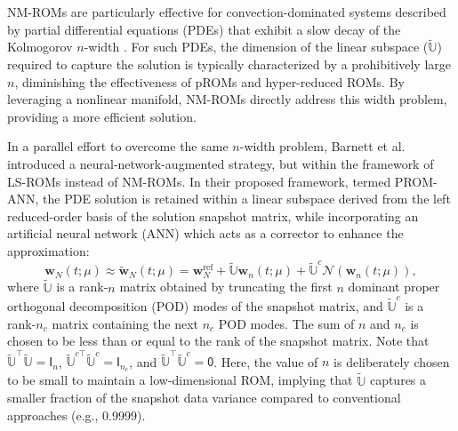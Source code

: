 \documentclass[11pt]{article}
\renewcommand{\vec}[1]{\mathbf{#1}}
\newcommand{\mat}[1]{\mathsf{#1}}
\begin{document}
NM-ROMs are particularly effective for convection-dominated systems described by partial differential equations (PDEs) that exhibit a slow decay of the Kolmogorov $n$-width \cite{lee2020model}.
For such PDEs, the dimension of the linear subspace (\(\widetilde{\mathbb{U}}\)) required to capture the solution is typically characterized by a prohibitively large $n$, diminishing the effectiveness of pROMs and hyper-reduced ROMs.
By leveraging a nonlinear manifold, NM-ROMs directly address this width problem, providing a more efficient solution.


In a parallel effort to overcome the same $n$-width problem, Barnett et al.
\cite{barnett2023neural-network-augmenteda} introduced a neural-network-augmented strategy, but within the framework of LS-ROMs instead of NM-ROMs.
In their proposed framework, termed PROM-ANN, the PDE solution is retained within a linear subspace derived from the left reduced-order basis of the solution snapshot matrix, while incorporating an artificial neural network (ANN) which acts as a corrector to enhance the approximation:
\begin{equation}
  \vec{w}_N(t; \mu) \approx \widetilde{\mathbf{w}}_N(t; \mu) = \mathbf{w}_N^{\text{ref}} +  \widetilde{\mathbb{U}} \vec{w}_n(t; \mu) + \widetilde{\mathbb{U}}^{c} \mathscr{N}(\vec{w}_n(t; \mu)),
  \label{eq:pROM_idea}
\end{equation}
where \(\widetilde{\mathbb{U}}\) is a rank-\(n\) matrix obtained by truncating the first \(n\) dominant proper orthogonal decomposition (POD) modes of the snapshot matrix, and \(\widetilde{\mathbb{U}}^c\) is a rank-\(n_c\) matrix containing the next \(n_c\) POD modes.
The sum of \(n\) and \(n_c\) is chosen to be less than or equal to the rank of the snapshot matrix.
Note that \(\widetilde{\mathbb{U}}^\top \widetilde{\mathbb{U}} = \mat{I}_n\), \(\widetilde{\mathbb{U}}^{c\top} \widetilde{\mathbb{U}}^{c} = \mat{I}_{n_c}\), and \(\widetilde{\mathbb{U}}^\top \widetilde{\mathbb{U}}^c = \mat{0}\).
Here, the value of \(n\) is deliberately chosen to be small to maintain a low-dimensional ROM, implying that \(\widetilde{\mathbb{U}}\) captures a smaller fraction of the snapshot data variance compared to conventional approaches (e.g., 0.9999).
\end{document}
